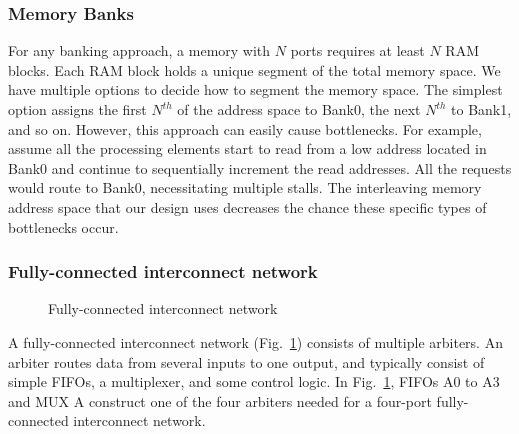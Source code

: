 \subsubsection{Memory Banks}
For any banking approach, a memory with $N$ ports requires at least $N$ RAM blocks. Each RAM block holds a unique segment of the total memory space. We have multiple options to decide how to segment the memory space. The simplest option assigns the first $N^{th}$ of the address space to Bank0, the next $N^{th}$ to Bank1, and so on. However, this approach can easily cause bottlenecks. For example, assume all the processing elements start to read from a low address located in Bank0 and continue to sequentially increment the read addresses. All the requests would route to Bank0, necessitating multiple stalls. The interleaving memory address space that our design uses decreases the chance these specific types of bottlenecks occur.
\subsubsection{Fully-connected interconnect network}
    \begin{figure}
        \center
        \caption{Fully-connected interconnect network}
        \label{fig:crossbar}
    \end{figure}

    A fully-connected interconnect network (Fig.~\ref{fig:crossbar}) consists of multiple arbiters. An arbiter routes data from several inputs to one output, and typically consist of simple FIFOs, a multiplexer, and some control logic. In Fig.~\ref{fig:crossbar}, FIFOs A0 to A3 and MUX A construct one of the four arbiters needed for a four-port fully-connected interconnect network.

